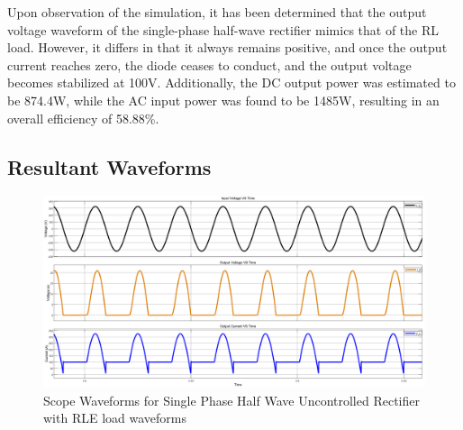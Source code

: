 Upon observation of the simulation, it has been determined that the output voltage waveform of the single-phase half-wave rectifier mimics that of the RL load. However, it differs in that it always remains positive, and once the output current reaches zero, the diode ceases to conduct, and the output voltage becomes stabilized at 100V.
Additionally, the DC output power was estimated to be 874.4W, while the AC input power was found to be 1485W, resulting in an overall efficiency of 58.88\%.

\pagebreak

\subsection{Resultant Waveforms}

\begin{figure}[h]
    \centering
    \includegraphics[width=1\textwidth]{images/experiment-1/circuit-scope-experiment-04.png}
    \caption{Scope Waveforms for Single Phase Half Wave Uncontrolled Rectifier with RLE load waveforms}
    \label{Fig_waveform_single-phase-half-wave-uncontrolled-rectifier-with-RLE-load}
\end{figure}

\pagebreak

